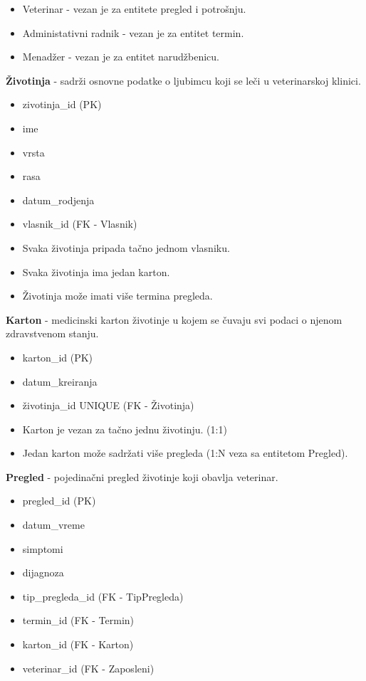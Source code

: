 \begin{itemize}{Tip zaposlenog:}
    \item Veterinar - vezan je za entitete pregled i potrošnju. 
    \item Administativni radnik - vezan je za entitet termin.
    \item  Menadžer - vezan je za entitet narudžbenicu.  
\end{itemize}

\indent\textbf{Životinja} - sadrži osnovne podatke o ljubimcu koji se leči u veterinarskoj klinici. 
\begin{itemize}{Atributi:}
    \item zivotinja\_id (PK)
    \item ime
    \item vrsta
    \item rasa
    \item datum\_rodjenja
    \item vlasnik\_id (FK - Vlasnik)
\end{itemize}

\begin{itemize}{Veze:}
    \item Svaka životinja pripada tačno jednom vlasniku.
    \item Svaka životinja ima jedan karton.
    \item Životinja može imati više termina pregleda.
\end{itemize}

\indent\textbf{Karton} - medicinski karton životinje u kojem se čuvaju svi podaci o njenom zdravstvenom stanju.
\begin{itemize}{Atributi:}
    \item karton\_id (PK)
    \item datum\_kreiranja
    \item životinja\_id UNIQUE (FK - Životinja)
\end{itemize}

\begin{itemize}{Veze:}
    \item Karton je vezan za tačno jednu životinju. (1:1)
    \item Jedan karton može sadržati više pregleda (1:N veza sa entitetom Pregled).
\end{itemize}

\indent\textbf{Pregled} - pojedinačni pregled životinje koji obavlja veterinar.
\begin{itemize}{Atributi:}
    \item pregled\_id (PK)
    \item datum\_vreme
    \item simptomi
    \item dijagnoza
    \item tip\_pregleda\_id (FK - TipPregleda)
    \item termin\_id (FK - Termin)
    \item karton\_id (FK - Karton)
    \item veterinar\_id (FK - Zaposleni)
\end{itemize}

